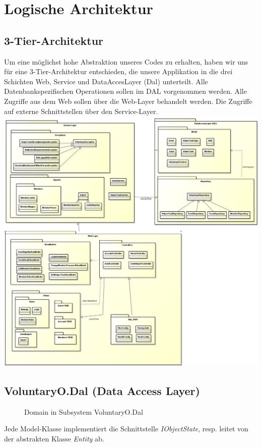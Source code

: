 \chapter{Logische Architektur}

\section{3-Tier-Architektur}
	Um eine möglichst hohe Abstraktion unseres Codes zu erhalten, haben wir uns für eine 3-Tier-Architektur entschieden, die unsere Applikation in die drei Schichten Web, Service und DataAccesLayer (Dal) unterteilt. Alle Datenbankspezifischen Operationen sollen im DAL vorgenommen werden. Alle Zugriffe aus dem Web sollen über die Web-Layer behandelt werden. Die Zugriffe auf externe Schnittstellen über den Service-Layer.
	\includegraphics[width=\textwidth]{content/architekturdokumentation/images/LogischeArchitektur.png}

\section{VoluntaryO.Dal (Data Access Layer)}
    \begin{figure}[h]
  		\vspace{-5pt}
    	\centering
  		\vspace{-25pt}
    	\caption{Domain in Subsystem VoluntaryO.Dal}
	\end{figure}
	Jede Model-Klasse implementiert die Schnittstelle \textit{IObjectState}, resp. leitet von der abstrakten Klasse \textit{Entity} ab.

